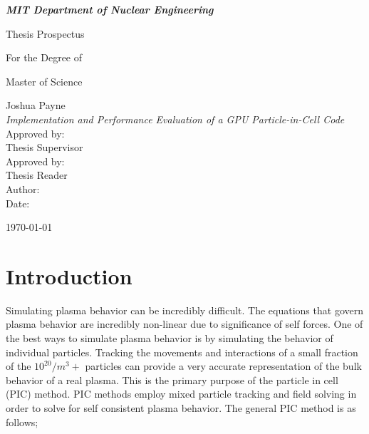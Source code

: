 \documentclass[12pt]{article} %
\author{Joshua Payne}
\begin{document}
\begin{titlepage}

\begin{center}

\textit{\textbf{\Large MIT Department of Nuclear Engineering}} \\[3.0cm]

\large

Thesis Prospectus

For the Degree of

Master of Science 

Joshua Payne\\[1.5cm]

\textit{Implementation and Performance Evaluation of a GPU Particle-in-Cell Code}\\[2.0cm]

\normalsize
Approved by:\underline{\hspace{5.5cm}}
\\ \hspace{2.0cm} Thesis Supervisor \\[1.0cm]

Approved by:\underline{\hspace{5.5cm}}
\\ \hspace{2.0cm} Thesis Reader \\[1.0cm]

Author:\underline{\hspace{6.4cm}} \\[1.0cm]

Date:\underline{\hspace{6.9cm}} \\[1.0cm]

\end{center}
\begin{flushright}
{\today}
\end{flushright}
\end{titlepage}

\doublespacing
\section{Introduction}

Simulating plasma behavior can be incredibly difficult. The equations that govern plasma behavior are incredibly non-linear due to significance of self forces. One of the best ways to simulate plasma behavior is by simulating the behavior of individual particles. Tracking the movements and interactions of a small fraction of the $10^{20}/m^3+$ particles can provide a very accurate representation of the bulk behavior of a real plasma. This is the primary purpose of the particle in cell (PIC) method. PIC methods employ mixed particle tracking and field solving in order to solve for self consistent plasma behavior. The general PIC method is as follows;
\end{document}
